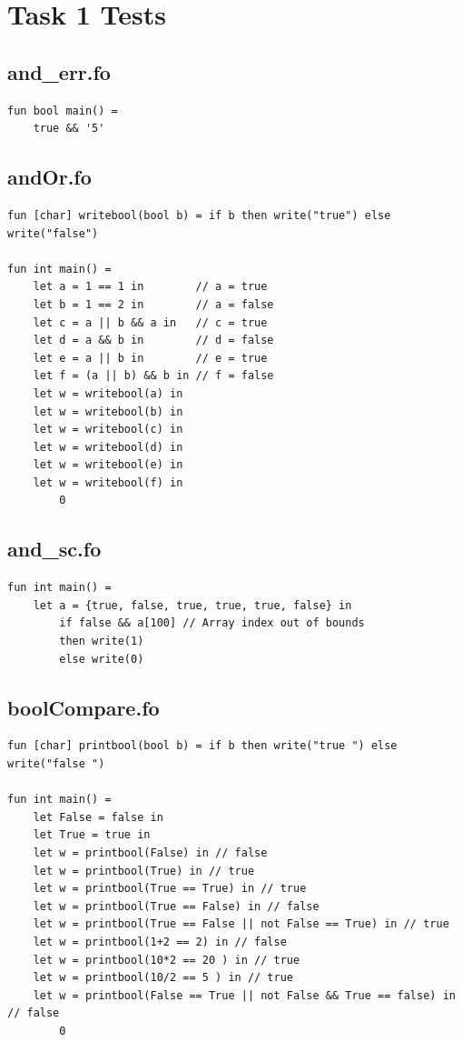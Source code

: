 \documentclass[11pt]{article}
\begin{document}
    \newpage
    \section{Task 1 Tests} \label{task_1_tests}
    \subsection{and\_err.fo}
    \begin{lstlisting}[basicstyle=\small]
fun bool main() =
    true && '5'
    \end{lstlisting}

    \subsection{andOr.fo}
    \begin{lstlisting}[basicstyle=\small]
fun [char] writebool(bool b) = if b then write("true") else write("false")

fun int main() =
    let a = 1 == 1 in        // a = true
    let b = 1 == 2 in        // a = false
    let c = a || b && a in   // c = true
    let d = a && b in        // d = false
    let e = a || b in        // e = true
    let f = (a || b) && b in // f = false
    let w = writebool(a) in
    let w = writebool(b) in
    let w = writebool(c) in
    let w = writebool(d) in
    let w = writebool(e) in
    let w = writebool(f) in
        0
    \end{lstlisting}

    \subsection{and\_sc.fo}
    \begin{lstlisting}[basicstyle=\small]
fun int main() =
    let a = {true, false, true, true, true, false} in
        if false && a[100] // Array index out of bounds
        then write(1)
        else write(0)
    \end{lstlisting}

    \subsection{boolCompare.fo}
    \begin{lstlisting}[basicstyle=\small]
fun [char] printbool(bool b) = if b then write("true ") else write("false ")

fun int main() =
    let False = false in
    let True = true in
    let w = printbool(False) in // false
    let w = printbool(True) in // true
    let w = printbool(True == True) in // true
    let w = printbool(True == False) in // false
    let w = printbool(True == False || not False == True) in // true
    let w = printbool(1+2 == 2) in // false
    let w = printbool(10*2 == 20 ) in // true
    let w = printbool(10/2 == 5 ) in // true
    let w = printbool(False == True || not False && True == false) in // false
        0
    \end{lstlisting}
\end{document}

